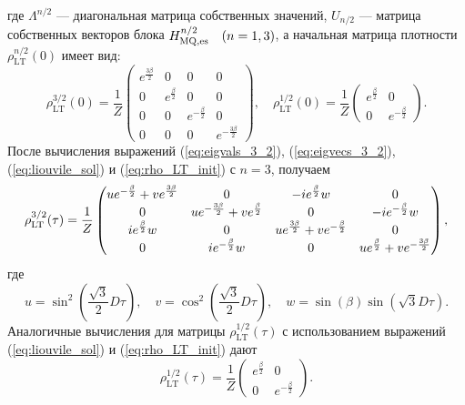 %
где $\Lambda^{n/2}$ --- диагональная матрица собственных значений,
$U_{n/2}$ --- матрица собственных векторов блока $H_\mathrm{MQ,es}^{n/2} \quad (n=1, 3)$,
а начальная матрица плотности $\rho_\mathrm{LT}^{n/2}(0)$ имеет вид:
%
\begin{equation}\label{eq:rho_LT_init}
  \rho_\mathrm{LT}^{3/2}(0) = \dfrac 1 Z
  \begin{pmatrix}
      e^{\frac{3\beta}{2}} & 0 & 0 & 0
      \\
      0 & e^{\frac{\beta}{2}} & 0 & 0
      \\
      0 & 0 & e^{-\frac{\beta}{2}} & 0
      \\
      0 & 0 & 0 & e^{-\frac{3\beta}{2}}
  \end{pmatrix},
  \quad
  \rho_\mathrm{LT}^{1/2}(0) = \dfrac 1 Z
  \begin{pmatrix}
      e^{\frac{\beta}{2}} & 0
      \\
      0 & e^{-\frac{\beta}{2}}
  \end{pmatrix}.
\end{equation}
После вычисления выражений
(\ref{eq:eigvals_3_2}),
(\ref{eq:eigvecs_3_2}),
(\ref{eq:liouvile_sol})
и (\ref{eq:rho_LT_init}) с $n = 3$,
получаем
%
\begin{equation}\label{eq:rho_LT_eval_3_2}
  \rho_\mathrm{LT}^{3/2}(\tau) = \frac{1}{Z} \\
  \begin{pmatrix}
      ue^{-\frac{\beta}{2}} + ve^{\frac{3\beta}{2}}
    &
      0
    &
      -ie^{\frac{\beta}{2}}w
    &
      0
    \\
      0
    &
      ue^{-\frac{3\beta}{2}} + ve^{\frac{\beta}{2}}
    &
      0
    &
      -ie^{-\frac{\beta}{2}}w
    \\
      ie^{\frac{\beta}{2}}w
    &
      0
    &
      ue^{\frac{3\beta}{2}} + ve^{-\frac{\beta}{2}}
    &
      0
    \\
      0
    &
      ie^{-\frac{\beta}{2}}w
    &
      0
    &
      ue^{\frac{\beta}{2}} + ve^{-\frac{3\beta}{2}}
  \end{pmatrix},
\end{equation}
где
\begin{equation}
    u = \sin^2\left(\frac{\sqrt{3}}{2}D\tau\right),
    \quad
    v = \cos^2\left(\frac{\sqrt{3}}{2}D\tau\right),
    \quad
    w = \sin(\beta)\sin\left(\sqrt{3}D\tau\right).
\end{equation}
%
Аналогичные вычисления для матрицы $\rho^{1/2}_\mathrm{LT} (\tau)$
с использованием выражений (\ref{eq:liouvile_sol}) и (\ref{eq:rho_LT_init})
дают
%
\begin{equation}
\label{eq:rho_LT_eval_1_2}
    \rho_\mathrm{LT}^{1/2}(\tau) = \frac 1 Z
    \begin{pmatrix}
            e^{\frac \beta 2}
        &
            0
        \\
            0
        &
            e^{-\frac \beta 2}
    \end{pmatrix}.
\end{equation}

